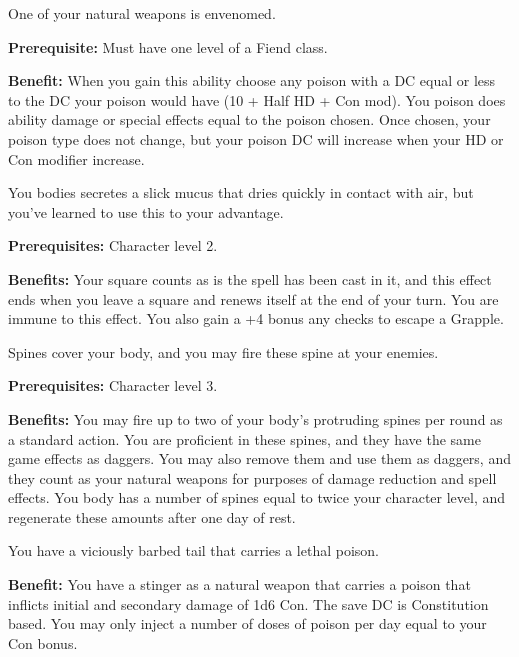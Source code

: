 
One of your natural weapons is envenomed.

\textbf{Prerequisite:} Must have one level of a Fiend class.

\textbf{Benefit:} When you gain this ability choose any poison with a DC equal or less to the DC your poison would have (10 + Half HD + Con mod). You poison does ability damage or special effects equal to the poison chosen. Once chosen, your poison type does not change, but your poison DC will increase when your HD or Con modifier increase.


You bodies secretes a slick mucus that dries quickly in contact with air, but you've learned to use this to your advantage.

\textbf{Prerequisites:} Character level 2.

\textbf{Benefits:} Your square counts as is the spell  has been cast in it, and this effect ends when you leave a square and renews itself at the end of your turn. You are immune to this effect. You also gain a +4 bonus any checks to escape a Grapple.


Spines cover your body, and you may fire these spine at your enemies.

\textbf{Prerequisites:} Character level 3.

\textbf{Benefits:} You may fire up to two of your body's protruding spines per round as a standard action. You are proficient in these spines, and they have the same game effects as daggers. You may also remove them and use them as daggers, and they count as your natural weapons for purposes of damage reduction and spell effects. You body has a number of spines equal to twice your character level, and regenerate these amounts after one day of rest.


You have a viciously barbed tail that carries a lethal poison.

\textbf{Benefit:} You have a stinger as a natural weapon that carries a poison that inflicts initial and secondary damage of 1d6 Con. The save DC is Constitution based. You may only inject a number of doses of poison per day equal to your Con bonus.



